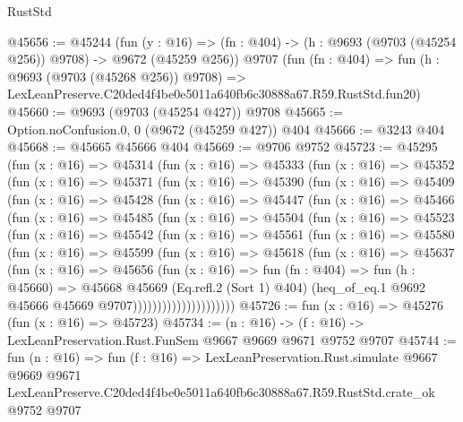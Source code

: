 \begin{lexlean}{RustStd}
\begin{coremodule}
@45656 := @45244
    (fun (y : @16) => (fn : @404) -> (h : @9693 (@9703 (@45254 @256)) @9708) -> @9672 (@45259 @256))
    @9707
    (fun (fn : @404) =>
    fun (h : @9693 (@9703 (@45268 @256)) @9708) =>
    LexLeanPreserve.C20ded4f4be0e5011a640fb6c30888a67.R59.RustStd.fun20)
@45660 := @9693 (@9703 (@45254 @427)) @9708
@45665 := Option.noConfusion.{0, 0} (@9672 (@45259 @427)) @404
@45666 := @3243 @404
@45668 := @45665 @45666 @404
@45669 := @9706 @9752
@45723 := @45295
    (fun (x : @16) =>
    @45314
      (fun (x : @16) =>
      @45333
        (fun (x : @16) =>
        @45352
          (fun (x : @16) =>
          @45371
            (fun (x : @16) =>
            @45390
              (fun (x : @16) =>
              @45409
                (fun (x : @16) =>
                @45428
                  (fun (x : @16) =>
                  @45447
                    (fun (x : @16) =>
                    @45466
                      (fun (x : @16) =>
                      @45485
                        (fun (x : @16) =>
                        @45504
                          (fun (x : @16) =>
                          @45523
                            (fun (x : @16) =>
                            @45542
                              (fun (x : @16) =>
                              @45561
                                (fun (x : @16) =>
                                @45580
                                  (fun (x : @16) =>
                                  @45599
                                    (fun (x : @16) =>
                                    @45618
                                      (fun (x : @16) =>
                                      @45637
                                        (fun (x : @16) =>
                                        @45656
                                          (fun (x : @16) =>
                                          fun (fn : @404) =>
                                          fun (h : @45660) =>
                                          @45668
                                            @45669
                                            (Eq.refl.{2} (Sort 1) @404)
                                            (heq_of_eq.{1}
                                              @9692
                                              @45666
                                              @45669
                                              @9707)))))))))))))))))))))
@45726 := fun (x : @16) => @45276 (fun (x : @16) => @45723)
@45734 := (n : @16) -> (f : @16) -> LexLeanPreservation.Rust.FunSem @9667 @9669 @9671 @9752 @9707
@45744 := fun (n : @16) =>
  fun (f : @16) =>
  LexLeanPreservation.Rust.simulate
    @9667
    @9669
    @9671
    LexLeanPreserve.C20ded4f4be0e5011a640fb6c30888a67.R59.RustStd.crate_ok
    @9752
    @9707
\end{coremodule}
\end{lexlean}
